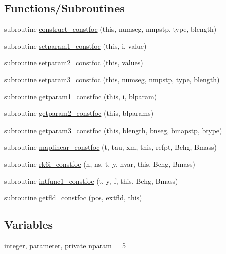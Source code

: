 \subsection*{Functions/\+Subroutines}
\begin{DoxyCompactItemize}
\item 
subroutine \mbox{\hyperlink{namespaceconstfocclass_a36197970c1524c85aeaea51d39f0ede7}{construct\+\_\+constfoc}} (this, numseg, nmpstp, type, blength)
\item 
subroutine \mbox{\hyperlink{namespaceconstfocclass_a14001bee7b5f9c4138d8042dcc94955c}{setparam1\+\_\+constfoc}} (this, i, value)
\item 
subroutine \mbox{\hyperlink{namespaceconstfocclass_a36ac221c9fb8e90f23b97b10cc272775}{setparam2\+\_\+constfoc}} (this, values)
\item 
subroutine \mbox{\hyperlink{namespaceconstfocclass_a9d02ddbf03689cdd653805ca5a56856e}{setparam3\+\_\+constfoc}} (this, numseg, nmpstp, type, blength)
\item 
subroutine \mbox{\hyperlink{namespaceconstfocclass_ab906b8830f5fb2cec09297d5004494e9}{getparam1\+\_\+constfoc}} (this, i, blparam)
\item 
subroutine \mbox{\hyperlink{namespaceconstfocclass_a59ea6cb7198ad0bf8446abe6978a9069}{getparam2\+\_\+constfoc}} (this, blparams)
\item 
subroutine \mbox{\hyperlink{namespaceconstfocclass_ae1fe9fc46cca742a797c388465086489}{getparam3\+\_\+constfoc}} (this, blength, bnseg, bmapstp, btype)
\item 
subroutine \mbox{\hyperlink{namespaceconstfocclass_af393c0fed039b82c7eb2aa347bc12bd8}{maplinear\+\_\+constfoc}} (t, tau, xm, this, refpt, Bchg, Bmass)
\item 
subroutine \mbox{\hyperlink{namespaceconstfocclass_a25aa498c0852e2952880172b61f0f034}{rk6i\+\_\+constfoc}} (h, ns, t, y, nvar, this, Bchg, Bmass)
\item 
subroutine \mbox{\hyperlink{namespaceconstfocclass_a6cedac4005af8166900c4d4b1afd707b}{intfunc1\+\_\+constfoc}} (t, y, f, this, Bchg, Bmass)
\item 
subroutine \mbox{\hyperlink{namespaceconstfocclass_a34425bf98b4a4cff016108f25a629dff}{getfld\+\_\+constfoc}} (pos, extfld, this)
\end{DoxyCompactItemize}
\subsection*{Variables}
\begin{DoxyCompactItemize}
\item 
integer, parameter, private \mbox{\hyperlink{namespaceconstfocclass_a4a04b85ebc26340b40e7c38cfad62bc1}{nparam}} = 5
\end{DoxyCompactItemize}


